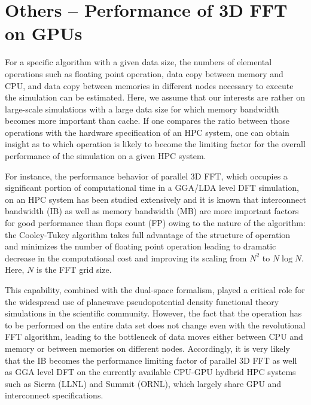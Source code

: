 
\section{Others -- Performance of 3D FFT on GPUs}
\label{sec:hpc}

For a specific algorithm with a given data size, the numbers of elemental operations such as floating point operation, data copy between memory and CPU, and data copy between memories in different nodes necessary to execute the simulation can be estimated. Here, we assume that our interests are rather on large-scale simulations with a large data size for which memory bandwidth becomes more important than cache. If one compares the ratio between those operations with the hardware specification of an HPC system, one can obtain insight as to which operation is likely to become the limiting factor for the overall performance of the simulation on a given HPC system. 

For instance, the performance behavior of parallel 3D FFT, which occupies a significant portion of computational time in a GGA/LDA level DFT simulation, on an HPC system has been studied extensively and it is known that interconnect bandwidth (IB) as well as memory bandwidth (MB) are more important factors for good performance than flops count (FP) owing to the nature of the algorithm: the Cooley-Tukey algorithm takes full advantage of the structure of operation and minimizes the number of floating point operation leading to dramatic decrease in the computational cost and improving its scaling from $N^2$ to $N\log{N}$.\cite{cooley1965} Here, $N$ is the FFT grid size.

This capability, combined with the dual-space formalism,\cite{Martin1988} played a critical role for the widespread use of planewave pseudopotential density functional theory simulations in the scientific community. However, the fact that the operation has to be performed on the entire data set does not change even with the revolutional FFT algorithm, leading to the bottleneck of data moves either between CPU and memory or between memories on different nodes. Accordingly, it is very likely that the IB becomes the performance limiting factor of parallel 3D FFT as well as GGA level DFT on the currently available CPU-GPU hydbrid HPC systems such as Sierra (LLNL) and Summit (ORNL), which largely share GPU and interconnect specifications. 

